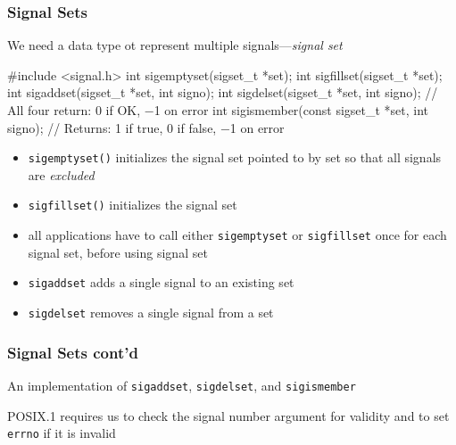 \documentclass[newPxFont,sthlmFooter,nooffset]{beamer}
\begin{document}
\begin{frame}[fragile,t]
  \frametitle{Signal Sets}
We need a data type ot represent multiple signals---\textit{signal set}

\begin{codedef}
#include <signal.h>
int sigemptyset(sigset_t *set);
int sigfillset(sigset_t *set);
int sigaddset(sigset_t *set, int signo); 
int sigdelset(sigset_t *set, int signo);
// All four return: 0 if OK, −1 on error 
int sigismember(const sigset_t *set, int signo);
// Returns: 1 if true, 0 if false, −1 on error
\end{codedef}

\begin{itemize}
\item \footnotesize \texttt{sigemptyset()} initializes the signal set pointed to by set so that all signals are \textit{excluded}
\item \footnotesize \texttt{sigfillset()} initializes the signal set
\item \footnotesize all applications have to call either \texttt{sigemptyset} or \texttt{sigfillset} once for each signal set, before using signal set
\item \footnotesize \texttt{sigaddset} adds a single signal to an existing set
\item \footnotesize \texttt{sigdelset} removes a single signal from a set
\end{itemize}

\end{frame}








\begin{frame}
  \frametitle{Signal Sets cont'd}
An implementation of \texttt{sigaddset}, \texttt{sigdelset}, and \texttt{sigismember}


POSIX.1 requires us to check the signal number argument for validity and to set \texttt{errno} if it is invalid
\end{frame}
\end{document}
